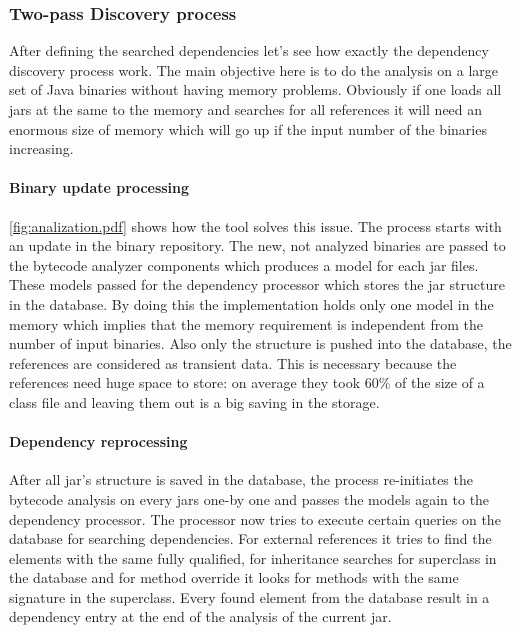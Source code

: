 \subsubsection{Two-pass Discovery process}
After defining the searched dependencies let's see how exactly the dependency
discovery process work. The main objective here is to do the analysis on a large
set of Java binaries without having memory problems. Obviously if one loads all
jars at the same to the memory and searches for all references it will need an
enormous size of memory which will go up if the input number of the binaries
increasing.


\paragraph{Binary update processing}
\autoref{fig:analization.pdf} shows how the tool solves this issue. The process
starts with an update in the binary repository. The new, not analyzed binaries
are passed to the bytecode analyzer components which produces a model for each
jar files. These models passed for the dependency processor which stores the jar
structure in the database. By doing this the implementation holds only one model
in the memory which implies that the memory requirement is independent from the
number of input binaries. Also only the structure is pushed into the database,
the references are considered as transient data. This is necessary because the
references need huge space to store: on average they took 60\% of the size of a
class file and leaving them out is a big saving in the storage.

\paragraph{Dependency reprocessing} 
After all jar's  structure is saved in the database, the process re-initiates
the bytecode analysis on every jars one-by one and passes the models again to
the dependency processor. The processor now tries to execute certain queries on
the database for searching dependencies. For external references it tries to
find the elements with the same fully qualified, for inheritance searches for
superclass in the database and for method override it looks for methods with
the same signature in the superclass. Every found element from the database 
result in a dependency entry at the end of the analysis of the current jar. 

